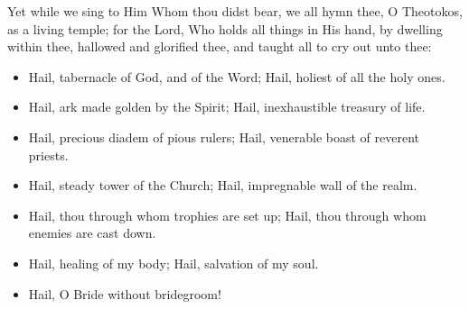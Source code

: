 \documentclass[twoside, letterpaper, 12pt]{report}
\begin{document}




\begin{reader}
  \item Yet while we sing to Him Whom thou didst bear,
  we all hymn thee, O Theotokos, as a living temple;
  for the Lord, Who holds all things in His hand, by dwelling within thee,
  hallowed and glorified thee, and taught all to cry out unto thee:
\end{reader}

\begin{itemize}[label=\tiny{+},leftmargin=*]
\item Hail, tabernacle of God, and of the Word;
      Hail, holiest of all the holy ones.
\item Hail, ark made golden by the Spirit;
      Hail, inexhaustible treasury of life.
\item Hail, precious diadem of pious rulers;
      Hail, venerable boast of reverent priests.
\item Hail, steady tower of the Church;
      Hail, impregnable wall of the realm.
\item Hail, thou through whom trophies are set up;
      Hail, thou through whom enemies are cast down.
\item Hail, healing of my body; Hail,
      salvation of my soul. 
\item Hail, O Bride without bridegroom!
\end{itemize}




\end{document}
